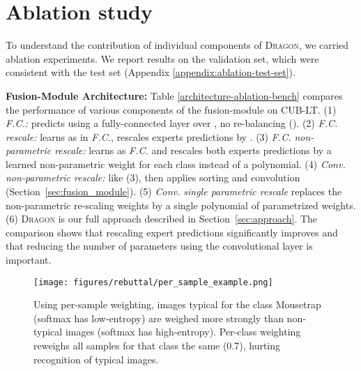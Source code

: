 \documentclass[10pt,twocolumn,letterpaper]{article}
\newcommand{\secref}[1]{Section~\ref{#1}}
\newcommand{\DRAGON}{\textsc{Dragon}}
\begin{document}
\section{Ablation study}
\label{sec:ablation}
To understand the contribution of individual components of \DRAGON{}, we carried ablation experiments. We report results on the validation set, which were consistent with the test set (Appendix \ref{appendix:ablation-test-set}).

\textbf{Fusion-Module Architecture:}
Table \ref{architecture-ablation-bench} compares the performance of various components of the fusion-module on CUB-LT.
(1) \textit{F.C.:} predicts  using a fully-connected layer over , no re-balancing (). 
(2) \textit{F.C.   rescale:} learns  as in \textit{F.C.}, rescales experts predictions by . (3) \textit{F.C.  non-parametric rescale:} learns  as \textit{F.C.} and rescales both experts predictions by a learned non-parametric weight for each class instead of a polynomial.
(4) \textit{Conv.  non-parametric rescale:} like (3), then applies sorting and convolution (\secref{sec:fusion_module}).
(5) \textit{Conv.  single parametric rescale} replaces the non-parametric re-scaling weights by a single polynomial of parametrized weights. (6) \DRAGON{} is our full approach  described in \secref{sec:approach}.
The comparison shows that rescaling expert predictions significantly improves  and that reducing the number of parameters using the convolutional layer is important.   

\begin{figure}[t!]
    \centering
   \texttt{[image: figures/rebuttal/per\_sample\_example.png]}
   \caption{Using per-sample weighting, images typical for the class Mousetrap (softmax has low-entropy) are weighed more strongly than non-typical images (softmax has high-entropy). Per-class weighting reweighs all samples for that class the same (0.7), hurting recognition of typical images.}
    \label{fig:per_sample_strength}
\end{figure}


\begin{table}
\centering
    \begin{sc}
    \end{sc}
    
    
\caption{Ablation study, comparing sm\DRAGON{} to \DRAGON{} on CUB-LT: Fusing information between modalities improves performance  (test set, CUB-LT).}\label{tab:smDragon_test}
\end{table}
\end{document}
